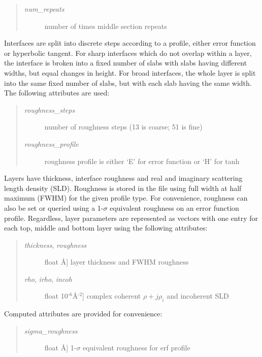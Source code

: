 \documentclass[letterpaper,10pt,english]{sphinxmanual}
\begin{document}
\begin{fulllineitems}
\begin{quote}
\begin{description}
\item[{\emph{num\_repeats}}] \leavevmode
number of times middle section repeats

\end{description}
\end{quote}

Interfaces are split into discrete steps according to a profile,
either error function or hyperbolic tangent.  For sharp interfaces
which do not overlap within a layer, the interface is broken into a
fixed number of slabs with slabs having different widths, but equal
changes in height.  For broad interfaces, the whole layer is split
into the same fixed number of slabs, but with each slab having the
same width.  The following attributes are used:
\begin{quote}
\begin{description}
\item[{\emph{roughness\_steps}}] \leavevmode
number of roughness steps (13 is coarse; 51 is fine)

\item[{\emph{roughness\_profile}}] \leavevmode
roughness profile is either `E' for error function or `H' for tanh

\end{description}
\end{quote}

Layers have thickness, interface roughness and real and imaginary
scattering length density (SLD).  Roughness is stored in the file
using full width at half maximum (FWHM) for the given profile type.
For convenience, roughness can also be set or queried using a 1-$\sigma$
equivalent roughness on an error function profile.  Regardless,
layer parameters are represented as vectors with one entry for each
top, middle and bottom layer using the following attributes:
\begin{quote}
\begin{description}
\item[{\emph{thickness}, \emph{roughness}}] \leavevmode{[}float \textbar{} Å{]}
layer thickness and FWHM roughness

\item[{\emph{rho}, \emph{irho}, \emph{incoh}}] \leavevmode{[}float \textbar{} 10$^{\text{-6}}$Å$^{\text{-2}}${]}
complex coherent $\rho + j \rho_i$ and incoherent SLD

\end{description}
\end{quote}

Computed attributes are provided for convenience:
\begin{quote}
\begin{description}
\item[{\emph{sigma\_roughness}}] \leavevmode{[}float \textbar{} Å{]}
1-$\sigma$ equivalent roughness for erf profile


\end{description}
\end{quote}
\end{fulllineitems}
\end{document}
